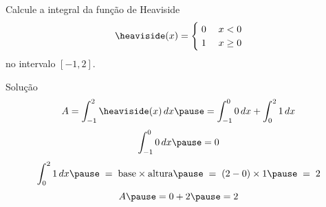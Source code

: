 \begin{question}
  Calcule a integral da função de Heaviside
  \[
  \heaviside(x) = \begin{cases}
    \; 0 & \; x < 0 \\
    \; 1 & \; x \geq 0
  \end{cases}
  \]
  no intervalo $[-1, 2]$.
\end{question}

\begin{resolution}{Solução}
  \[
    A
    = \int_{-1}^{2} \heaviside(x) \,dx
    \pause
    = \int_{-1}^{0} 0 \,dx
    + \int_{0}^{2}  1 \,dx
  \]
  \pause
  \[
    \int_{-1}^{0} 0 \,dx
    \pause
    = 0
  \]
  \pause
  \[
    \int_{0}^{2} 1 \,dx
    \pause
    \;=\; \text{base} \times \text{altura}
    \pause
    \;=\; (2-0)\times 1
    \pause
    \;=\; 2
  \]
  \pause
  \[
    A
    \pause
    = 0 + 2
    \pause
    = 2
  \]
\end{resolution}


